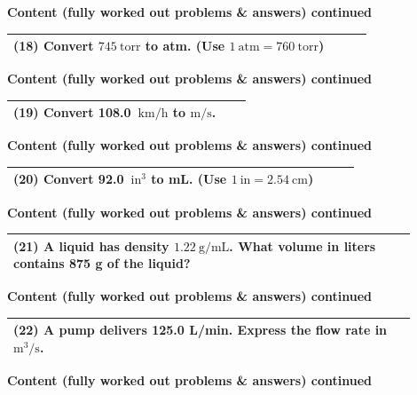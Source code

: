 \documentclass{article}
\begin{document}
\noindent
{\large \textbf{Content (fully worked out problems \& answers) continued}} \\[0.2em]
\begin{tabular}{|p{0.9\linewidth}|}
\hline
\vspace{0.2cm}

\textbf{(18)} Convert $745~\text{torr}$ to atm. (Use $1~\text{atm}=760~\text{torr}$) \\
\hline
\end{tabular}
\newpage
\noindent
{\large \textbf{Content (fully worked out problems \& answers) continued}} \\[0.2em]
\begin{tabular}{|p{0.9\linewidth}|}
\hline
\vspace{0.2cm}

\textbf{(19)} Convert 108.0~$\text{km/h}$ to $\text{m/s}$. \\
\hline
\end{tabular}
\newpage
\noindent
{\large \textbf{Content (fully worked out problems \& answers) continued}} \\[0.2em]
\begin{tabular}{|p{0.9\linewidth}|}
\hline
\vspace{0.2cm}

\textbf{(20)} Convert 92.0~$\text{in}^3$ to mL. (Use $1~\text{in}=2.54~\text{cm}$) \\
\hline
\end{tabular}
\newpage
\noindent
{\large \textbf{Content (fully worked out problems \& answers) continued}} \\[0.2em]
\begin{tabular}{|p{0.9\linewidth}|}
\hline
\vspace{0.2cm}

\textbf{(21)} A liquid has density $1.22~\text{g/mL}$. What volume in liters contains 875 g of the liquid? \\
\hline
\end{tabular}
\newpage
\noindent
{\large \textbf{Content (fully worked out problems \& answers) continued}} \\[0.2em]
\begin{tabular}{|p{0.9\linewidth}|}
\hline
\vspace{0.2cm}

\textbf{(22)} A pump delivers 125.0 L/min. Express the flow rate in $\text{m}^3/\text{s}$. \\
\hline
\end{tabular}
\newpage
\noindent
{\large \textbf{Content (fully worked out problems \& answers) continued}} \\[0.2em]
\end{document}
